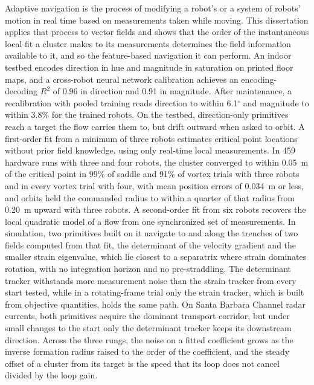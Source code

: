 \documentclass[12pt, letterpaper, oneside]{report}
\begin{document}
\noindent
Adaptive navigation is the process of modifying a robot's or a system of
robots' motion in real time based on measurements taken while moving. This
dissertation applies that process to vector fields and shows that the
order of the instantaneous local fit a cluster makes to its measurements
determines the field information available to it, and so the feature-based
navigation it can perform. An indoor testbed encodes direction in hue and
magnitude in saturation on printed floor maps, and a cross-robot neural
network calibration achieves an encoding-decoding $R^2$ of 0.96 in direction
and 0.91 in magnitude. After maintenance, a recalibration with pooled
training reads direction to within 6.1$^\circ$ and magnitude to within
3.8\% for the trained robots. On the testbed, direction-only primitives
reach a target the flow carries them to, but drift outward when asked to
orbit. A first-order fit from a minimum of three robots estimates critical
point locations without prior field knowledge, using only real-time local
measurements. In 459 hardware runs with three and four robots, the
cluster converged to within 0.05~m of the critical point in 99\% of saddle
and 91\% of vortex trials with three robots and in every vortex trial with
four, with mean position errors of 0.034~m or less, and orbits held the
commanded radius to within a quarter of that radius from 0.20~m upward
with three robots. A
second-order fit from six robots recovers the local quadratic model of a
flow from one synchronized set of measurements. In simulation, two
primitives built on it navigate to and along the trenches of two fields
computed from that fit, the determinant of the velocity gradient and the
smaller strain eigenvalue, which lie closest to a separatrix where strain
dominates rotation, with no integration horizon and no pre-straddling. The
determinant tracker withstands more measurement noise than the strain
tracker from every start tested, while in a rotating-frame trial only the
strain tracker, which is built from objective quantities, holds the same
path. On Santa Barbara Channel radar currents, both primitives acquire the
dominant transport corridor, but under small changes to the start only the
determinant tracker keeps its downstream direction. Across the three rungs,
the noise on a fitted coefficient grows as the inverse formation radius
raised to the order of the coefficient, and the steady offset of a cluster
from its target is the speed that its loop does not cancel divided by the
loop gain.
\end{document}
